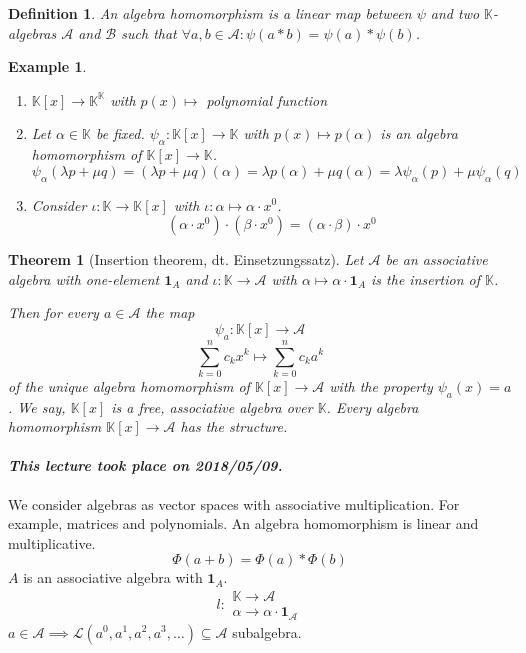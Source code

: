 \documentclass{article}
\newtheorem{theorem}{Theorem}  \numberwithin{theorem}{section}
\newtheorem{example}{Example}  \numberwithin{example}{section}
\newtheorem{definition}{Definition}  \numberwithin{definition}{section}
\newcommand{\dateref}[1]{\paragraph{\textit{This lecture took place on #1.}}}
\begin{document}
\begin{definition} %
  An algebra homomorphism is a linear map between $\psi$ and two $\mathbb K$-algebras $\mathcal A$ and $\mathcal B$ such that
  $\forall a,b \in \mathcal A: \psi(a * b) = \psi(a) * \psi(b)$.
\end{definition}

\begin{example} %
  \begin{enumerate}
    \item $\mathbb K[x] \to \mathbb K^{\mathbb K}$ with $p(x) \mapsto$ polynomial function
    \item
      Let $\alpha \in \mathbb K$ be fixed.
      $\psi_{\alpha}: \mathbb K[x] \to \mathbb K$ with $p(x) \mapsto p(\alpha)$ is an algebra homomorphism of $\mathbb K[x] \to \mathbb K$.
      \[ \psi_\alpha(\lambda p + \mu q) = (\lambda p + \mu q)(\alpha) = \lambda p(\alpha) + \mu q(\alpha) = \lambda \psi_{\alpha}(p) + \mu \psi_{\alpha}(q) \]
    \item Consider $\iota: \mathbb K \to \mathbb K[x]$ with $\iota: \alpha \mapsto \alpha \cdot x^0$.
      \[ (\alpha \cdot x^0) \cdot (\beta \cdot x^0) = (\alpha \cdot \beta) \cdot x^0 \]
  \end{enumerate}
\end{example}

\begin{theorem}[Insertion theorem, dt. \foreignlanguage{german}{Einsetzungssatz}] %
  Let $\mathcal A$ be an associative algebra with one-element $\mathbf 1_A$
  and $\iota: \mathbb K \to \mathcal A$ with $\alpha \mapsto \alpha \cdot \mathbf 1_A$ is the insertion of $\mathbb K$.

  Then for every $a \in \mathcal A$ the map
  \[ \psi_a: \mathbb K[x] \to \mathcal A \]
  \[ \sum_{k=0}^n c_k x^k \mapsto \sum_{k=0}^n c_k a^k \]
  of the unique algebra homomorphism of $\mathbb K[x] \to \mathcal A$ with the property $\psi_a(x) = a$.
  We say, $\mathbb K[x]$ is a \emph{free, associative algebra over $\mathbb K$}.
  Every algebra homomorphism $\mathbb K[x] \to \mathcal A$ has the structure.
\end{theorem}

\dateref{2018/05/09}

We consider algebras as vector spaces with associative multiplication. For example, matrices and polynomials.
An algebra homomorphism is linear and multiplicative.
\[ \Phi(a + b)= \Phi(a) * \Phi(b) \]
$A$ is an associative algebra with $\mathbf 1_A$.
\[ l: \substack{\mathbb K \to \mathcal A \\ \alpha \to \alpha \cdot \mathbf 1_{\mathcal A}} \]
$a \in \mathcal A \implies \mathcal L(a^0, a^1, a^2, a^3, \dots) \subseteq \mathcal A$ subalgebra.
\end{document}
